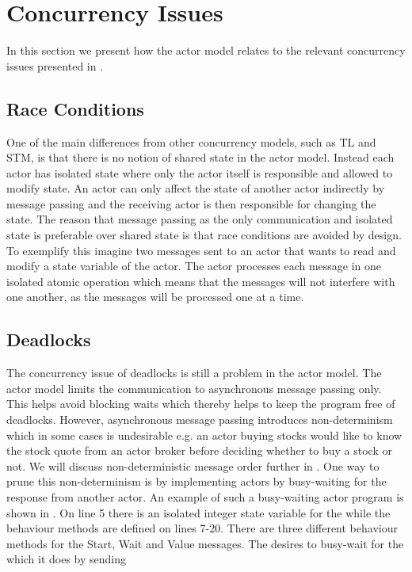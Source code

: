 \section{Concurrency Issues}\label{sec:actor_con_issues}
In this section we present how the actor model relates to the relevant concurrency issues presented in .

\subsection{Race Conditions}
One of the main differences from other concurrency models, such as \ac{TL} and \ac{STM}, is that there is no notion of shared state in the actor model. Instead each actor has isolated state where only the actor itself is responsible and allowed to modify state. An actor can only affect the state of another actor indirectly by message passing and the receiving actor is then responsible for changing the state. The reason that message passing as the only communication and isolated state is preferable over shared state is that race conditions are avoided by design. To exemplify this imagine two messages sent to an actor that wants to read and modify a state variable of the actor. The actor processes each message in one isolated atomic operation which means that the messages will not interfere with one another, as the messages will be processed one at a time.

\subsection{Deadlocks}\label{ssec:actor_deadlock}
The concurrency issue of deadlocks is still a problem in the actor model. The actor model limits the communication to asynchronous message passing only. This helps avoid blocking waits which thereby helps to keep the program free of deadlocks\cite[p. 304]{tasharofi2013scala}. However, asynchronous message passing introduces non-determinism which in some cases is undesirable e.g. an actor buying stocks would like to know the stock quote from an actor broker before deciding whether to buy a stock or not. We will discuss non-deterministic message order further in . One way to prune this non-determinism is by implementing actors by busy-waiting for the response from another actor. An example of such a busy-waiting actor program is shown in . On line 5 there is an isolated integer state variable for the  while the behaviour methods are defined on lines 7-20. There are three different behaviour methods for the Start, Wait and Value messages. The  desires to busy-wait for the  which it does by sending 

